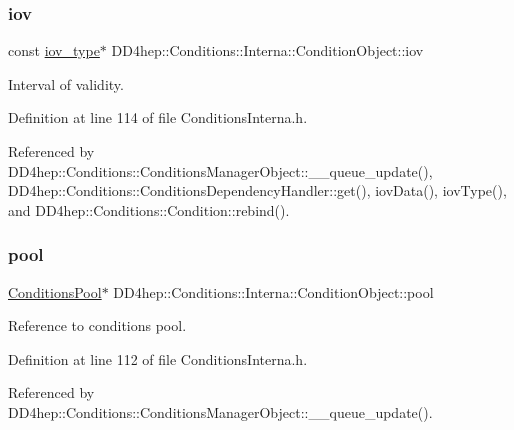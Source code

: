 \subsubsection{\texorpdfstring{iov}{iov}}
{\footnotesize\ttfamily const \hyperlink{class_d_d4hep_1_1_conditions_1_1_interna_1_1_condition_object_a6d54716450a73a1a439ca06445f56d24}{iov\+\_\+type}$\ast$ D\+D4hep\+::\+Conditions\+::\+Interna\+::\+Condition\+Object\+::iov}



Interval of validity. 



Definition at line 114 of file Conditions\+Interna.\+h.



Referenced by D\+D4hep\+::\+Conditions\+::\+Conditions\+Manager\+Object\+::\+\_\+\+\_\+queue\+\_\+update(), D\+D4hep\+::\+Conditions\+::\+Conditions\+Dependency\+Handler\+::get(), iov\+Data(), iov\+Type(), and D\+D4hep\+::\+Conditions\+::\+Condition\+::rebind().

\hypertarget{class_d_d4hep_1_1_conditions_1_1_interna_1_1_condition_object_a47997f68ec8b07ffe938d869726b6012}{}\label{class_d_d4hep_1_1_conditions_1_1_interna_1_1_condition_object_a47997f68ec8b07ffe938d869726b6012} 
\subsubsection{\texorpdfstring{pool}{pool}}
{\footnotesize\ttfamily \hyperlink{class_d_d4hep_1_1_conditions_1_1_conditions_pool}{Conditions\+Pool}$\ast$ D\+D4hep\+::\+Conditions\+::\+Interna\+::\+Condition\+Object\+::pool}



Reference to conditions pool. 



Definition at line 112 of file Conditions\+Interna.\+h.



Referenced by D\+D4hep\+::\+Conditions\+::\+Conditions\+Manager\+Object\+::\+\_\+\+\_\+queue\+\_\+update().

\hypertarget{class_d_d4hep_1_1_conditions_1_1_interna_1_1_condition_object_a0a8d0c67b38ca524010ed5d6ccdd1961}{}\label{class_d_d4hep_1_1_conditions_1_1_interna_1_1_condition_object_a0a8d0c67b38ca524010ed5d6ccdd1961} 
